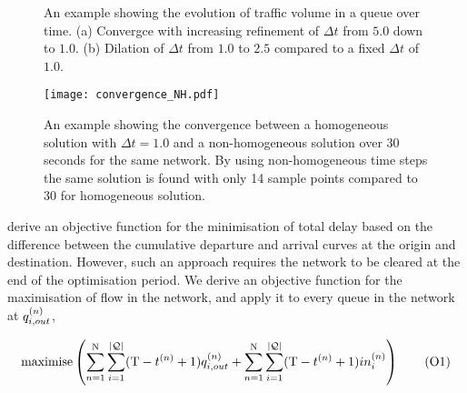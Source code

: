 
\begin{figure*}[t!]
\centering
\caption{An example showing the evolution of traffic volume in a queue over
time. (a) Convergce with increasing refinement of $\Delta t$ from $5.0$ down to
$1.0$. (b) Dilation of $\Delta t$ from $1.0$ to $2.5$ compared to a fixed
$\Delta t$ of $1.0$.}

\end{figure*}

\begin{figure*}[t!]
\centering

\label{subfig:converg_c}
\texttt{[image: convergence\_NH.pdf]}
\caption{An example showing the convergence between a homogeneous solution with
$\Delta t=1.0$ and a non-homogeneous solution over 30 seconds for the same
network. By using non-homogeneous time steps the same solution is found with
only 14 sample points compared to 30 for homogeneous solution.}

\end{figure*}



 derive an objective function for the minimisation of
total delay based on the difference between the cumulative departure and arrival
curves at the origin and destination. However, such an approach requires the
network to be cleared at the end of the optimisation period. We derive an
objective function for the maximisation of flow in the network, and apply it to
every queue in the network at $q_{i,out}^{(n)}$,


\begin{equation}
\textrm{maximise} \left( \sum\limits_{n=1}^{\mathrm{N}} \sum\limits_{i=1}^{|\mathcal{\mathcal{Q}}|} (\mathrm{T} - t^{(n)} + 1) q_{i,out}^{(n)} + \sum\limits_{n=1}^{\mathrm{N}} \sum\limits_{i=1}^{|\mathcal{\mathcal{Q}}|} (\mathrm{T} - t^{(n)} + 1) in_{i}^{(n)} \right) 
\tag{O1}\label{eq:O1}
\end{equation}

